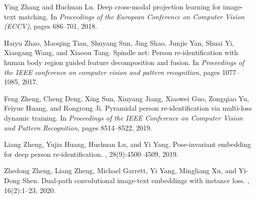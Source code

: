 \documentclass[final]{cvpr}
\begin{document}
\begin{thebibliography}{10}
Ying Zhang and Huchuan Lu.
\newblock Deep cross-modal projection learning for image-text matching.
\newblock In {\em Proceedings of the European Conference on Computer Vision
  (ECCV)}, pages 686--701, 2018.

Haiyu Zhao, Maoqing Tian, Shuyang Sun, Jing Shao, Junjie Yan, Shuai Yi,
  Xiaogang Wang, and Xiaoou Tang.
\newblock Spindle net: Person re-identification with human body region guided
  feature decomposition and fusion.
\newblock In {\em Proceedings of the IEEE conference on computer vision and
  pattern recognition}, pages 1077--1085, 2017.

Feng Zheng, Cheng Deng, Xing Sun, Xinyang Jiang, Xiaowei Guo, Zongqiao Yu,
  Feiyue Huang, and Rongrong Ji.
\newblock Pyramidal person re-identification via multi-loss dynamic training.
\newblock In {\em Proceedings of the IEEE Conference on Computer Vision and
  Pattern Recognition}, pages 8514--8522, 2019.

Liang Zheng, Yujia Huang, Huchuan Lu, and Yi Yang.
\newblock Pose-invariant embedding for deep person re-identification.
, 28(9):4500--4509, 2019.

Zhedong Zheng, Liang Zheng, Michael Garrett, Yi Yang, Mingliang Xu, and Yi-Dong
  Shen.
\newblock Dual-path convolutional image-text embeddings with instance loss.
, 16(2):1--23, 2020.

\end{thebibliography}
 
\end{document}
